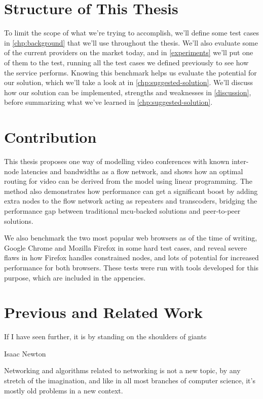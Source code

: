 \section{Structure of This Thesis}

To limit the scope of what we're trying to accomplish, we'll define some test cases in \autoref{chp:background} that we'll use throughout the thesis. We'll also evaluate some of the current providers on the market today, and in \autoref{experiments} we'll put one of them to the test, running all the test cases we defined previously to see how the service performs. Knowing this benchmark helps us evaluate the potential for our solution, which we'll take a look at in \autoref{chp:suggested-solution}. We'll discuss how our solution can be implemented, strengths and weaknesses in \autoref{discussion}, before summarizing what we've learned in \autoref{chp:suggested-solution}.


\section{Contribution}

This thesis proposes one way of modelling video conferences with known inter-node latencies and bandwidths as a flow network, and shows how an optimal routing for video can be derived from the model using linear programming. The method also demonstrates how performance can get a significant boost by adding extra nodes to the flow network acting as repeaters and transcoders, bridging the performance gap between traditional \gls{mcu}-backed solutions and peer-to-peer solutions.

We also benchmark the two most popular web browsers as of the time of writing, Google Chrome and Mozilla Firefox in some hard test cases, and reveal severe flaws in how Firefox handles constrained nodes, and lots of potential for increased performance for both browsers. These tests were run with tools developed for this purpose, which are included in the appencies.


\section{Previous and Related Work}

\epigraph{If I have seen further, it is by standing on the shoulders of giants}{Isaac Newton}

Networking and algorithms related to networking is not a new topic, by any stretch of the imagination, and like in all most branches of computer science, it's mostly old problems in a new context.

